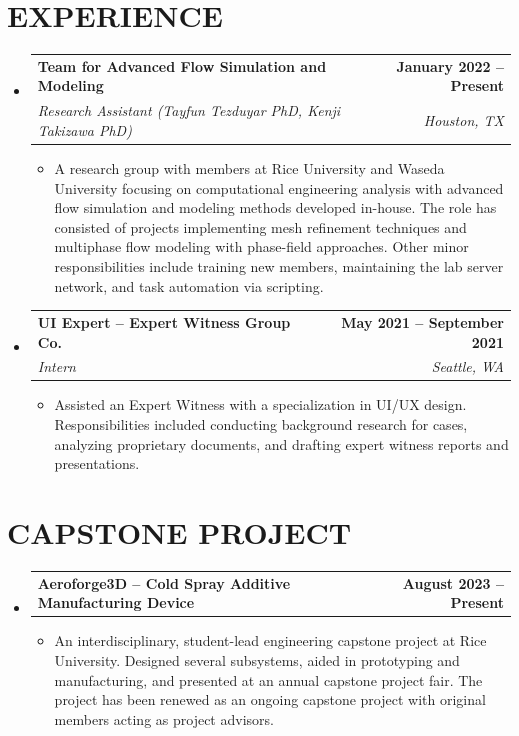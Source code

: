 \documentclass[letterpaper,11pt]{article}
\makeatletter
\newcommand{\resumeItem}[1]{
  \item \small{
    {#1 \vspace{-2pt}}
  }
}
\newcommand{\resumeSubheading}[4]{
  \vspace{-2pt}\item
    \begin{tabular*}{1.0\textwidth}[t]{l@{\extracolsep{\fill}}r}
      \textbf{#1} & \textbf{\small #2} \\
      \textit{\small#3} & \textit{\small #4} \\
    \end{tabular*}\vspace{-7pt}
}
\newcommand{\projectSubheading}[2]{
  \vspace{-2pt}\item
    \begin{tabular*}{1.0\textwidth}[t]{l@{\extracolsep{\fill}}r}
      \textbf{#1} & \textbf{\small #2} \\
    \end{tabular*}\vspace{-7pt}
}
\newcommand{\resumeSubHeadingListStart}{\begin{itemize}[leftmargin=0.0in, label={}]}
\newcommand{\resumeSubHeadingListEnd}{\end{itemize}}
\newcommand{\resumeItemListStart}{\begin{itemize}}
\newcommand{\resumeItemListEnd}{\end{itemize}\vspace{-5pt}}
\makeatother
\begin{document}
\section{EXPERIENCE}
  \resumeSubHeadingListStart

    \resumeSubheading
      {Team for Advanced Flow Simulation and Modeling}{January 2022 -- Present}
      {Research Assistant (Tayfun Tezduyar PhD, Kenji Takizawa PhD)}{Houston, TX}
      \resumeItemListStart
        \resumeItem{A research group with members at Rice University and Waseda University focusing on computational engineering analysis with advanced flow simulation and modeling methods developed in-house. The role has consisted of projects implementing mesh refinement techniques and multiphase flow modeling with phase-field approaches. Other minor responsibilities include training new members, maintaining the lab server network, and task automation via scripting.}
      \resumeItemListEnd   
    \vspace{-12pt}
    \resumeSubheading
      {UI Expert -- Expert Witness Group Co.}{May 2021 -- September 2021}
      {Intern}{Seattle, WA}
      \resumeItemListStart
        \resumeItem{Assisted an Expert Witness with a specialization in UI/UX design. Responsibilities included conducting background research for cases, analyzing proprietary documents, and drafting expert witness reports and presentations.}
      \resumeItemListEnd   
 
    \resumeSubHeadingListEnd
 \vspace{-10pt}

\section{CAPSTONE PROJECT}

    \resumeSubHeadingListStart
      \projectSubheading
        {Aeroforge3D -- Cold Spray Additive Manufacturing Device}{August 2023 -- Present}
        \resumeItemListStart
          \resumeItem{An interdisciplinary, student-lead engineering capstone project at Rice University. Designed several subsystems, aided in prototyping and manufacturing, and presented at an annual capstone project fair. The project has been renewed as an ongoing capstone project with original members acting as project advisors.}
        \resumeItemListEnd   
  \resumeSubHeadingListEnd
\vspace{-10pt}

\end{document}

